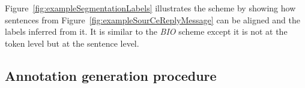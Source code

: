 








%
%
Figure~\ref{fig:exampleSegmentationLabels} illustrates the scheme by showing how sentences from Figure~\ref{fig:exampleSourCeReplyMessage} can be aligned and the labels inferred from it. 
%
It is similar to the \textit{BIO} %
scheme except it is not at the token level but at the sentence level. %



\subsection{Annotation generation procedure}
\label{}


